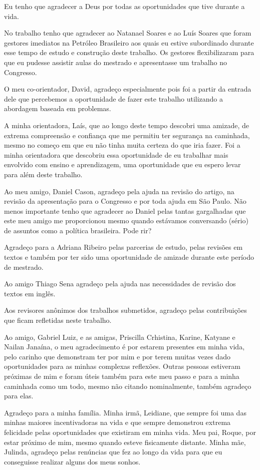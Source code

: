 \acknowledgements
Eu tenho que agradecer a Deus por todas as oportunidades
que tive durante a vida.

No trabalho tenho que agradecer ao Natanael Soares e ao
Luís Soares que foram gestores imediatos na Petróleo
Brasileiro aos quais eu estive subordinado durante
esse tempo de estudo e construção deste trabalho.
Os gestores flexibilizaram para que eu pudesse
assistir aulas do mestrado e apresentasse
um trabalho no Congresso.

O meu co-orientador, David, agradeço especialmente
pois foi a partir da entrada dele que percebemos
a oportunidade de fazer este trabalho utilizando a
abordagem baseada em problemas.

A minha orientadora, Laís, que ao longo deste tempo descobri
uma amizade, de extrema compreensão e confiança
que me permitiu ter segurança na caminhada, mesmo no
começo em que eu não tinha muita certeza do que iria
fazer.
Foi a minha orientadora que descobriu essa oportunidade
de eu trabalhar mais envolvido com ensino e aprendizagem,
uma oportunidade que eu espero levar para
além deste trabalho.

Ao meu amigo, Daniel Cason, agradeço pela ajuda na
revisão do artigo, na revisão da apresentação
para o Congresso e por toda ajuda em São Paulo.
Não menos importante tenho que agradecer ao Daniel
pelas tantas gargalhadas que este meu amigo me
proporcionou mesmo quando estávamos conversando
(sério) de assuntos como a política brasileira.
Pode rir?

Agradeço para a Adriana Ribeiro pelas parcerias
de estudo, pelas revisões em textos e também
por ter sido uma oportunidade de amizade durante
este período de mestrado.

Ao amigo Thiago Sena agradeço pela ajuda
nas necessidades de revisão dos textos em
inglês.

Aos revisores anônimos dos trabalhos submetidos,
agradeço pelas contribuições que ficam
refletidas neste trabalho.

Ao amigo, Gabriel Luiz, e as amigas,
Priscilla Crhistina, Karine, Katyane
e Nailan Janaína, o meu agradecimento é
por estarem presentes em minha vida,
pelo carinho que demonstram ter
por mim e por terem muitas vezes dado
oportunidades para as minhas complexas
reflexões.
Outras pessoas estiveram próximas de mim e
foram úteis também para este meu passo e para
a minha caminhada como um todo, mesmo não citando
nominalmente, também agradeço para elas.

Agradeço para a minha família.
Minha irmã, Leidiane, que sempre foi uma das minhas
maiores incentivadoras na vida e que sempre
demonstrou extrema felicidade pelas oportunidades
que existiram em minha vida.
Meu pai, Roque, por estar próximo de mim,
mesmo quando esteve fisicamente distante.
Minha mãe, Julinda, agradeço pelas renúncias que
fez ao longo da vida para que eu conseguisse realizar
alguns dos meus sonhos.
